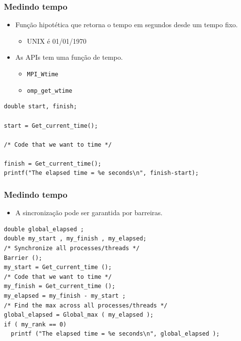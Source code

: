 \documentclass[xcolor={usenames,dvipsnames},12pt,presentation,aspectratio=169]{beamer}
\begin{document}
\begin{frame}[fragile]
  \frametitle{Medindo tempo}
  \begin{itemize}
    \item Função hipotética que retorna o tempo em segundos desde um tempo fixo.
    \begin{itemize}
      \item UNIX é 01/01/1970
    \end{itemize}
    \item As APIs tem uma função de tempo.
    \begin{itemize}
      \item \texttt{MPI_Wtime}
      \item \texttt{omp_get_wtime}
    \end{itemize}
  \end{itemize}
\begin{center}
\begin{minipage}{0.9\textwidth}
  \begin{verbatim}
double start, finish;

start = Get_current_time();

/* Code that we want to time */

finish = Get_current_time();
printf("The elapsed time = %e seconds\n", finish-start);
  \end{verbatim}
\end{minipage}
\end{center}  
\end{frame}
\begin{frame}[fragile]
  \frametitle{Medindo tempo}
  \begin{itemize}
    \item A sincronização pode ser garantida por barreiras.
  \end{itemize}
\begin{center}
\begin{minipage}{0.9\textwidth}
  \begin{verbatim}
double global_elapsed ;
double my_start , my_finish , my_elapsed;
/* Synchronize all processes/threads */
Barrier ();
my_start = Get_current_time ();
/* Code that we want to time */
my_finish = Get_current_time ();
my_elapsed = my_finish - my_start ;
/* Find the max across all processes/threads */
global_elapsed = Global_max ( my_elapsed );
if ( my_rank == 0)
  printf ("The elapsed time = %e seconds\n", global_elapsed );
  \end{verbatim}
\end{minipage}
\end{center}  
\end{frame}
\end{document}

